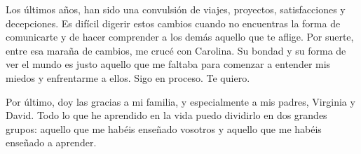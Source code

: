 Los últimos años, han sido una convulsión de viajes, proyectos, satisfacciones y decepciones. Es difícil digerir estos cambios cuando no encuentras la forma de comunicarte y de hacer comprender a los demás aquello que te aflige. Por suerte, entre esa maraña de cambios, me crucé con Carolina. Su bondad y su forma de ver el mundo es justo aquello que me faltaba para comenzar a entender mis miedos y enfrentarme a ellos. Sigo en proceso. Te quiero.

Por último, doy las gracias a mi familia, y especialmente a mis padres, Virginia y David. Todo lo que he aprendido en la vida puedo dividirlo en dos grandes grupos: aquello que me habéis enseñado vosotros y aquello que me habéis enseñado a aprender.